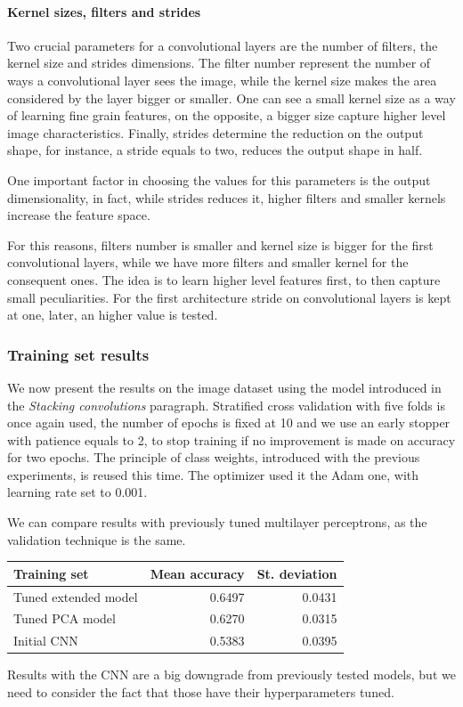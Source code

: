 \paragraph{Kernel sizes, filters and strides}
Two crucial parameters for a convolutional layers are the number of filters, 
the kernel size and strides dimensions. 
The filter number represent the number of ways a 
convolutional layer sees the image, while the kernel size makes the area 
considered by the layer bigger or smaller. One can see a small kernel size as a way 
of learning fine grain features, on the opposite, a bigger size capture higher level image characteristics.
Finally, strides determine the reduction on the output shape, for instance, a stride equals to 
two, reduces the output shape in half.

One important factor in choosing the values for this parameters is the output dimensionality, 
in fact, while strides reduces it, higher filters and smaller kernels increase 
the feature space.

For this reasons, filters number is smaller and kernel size is bigger for the first 
convolutional layers, while we have more filters and smaller kernel for the consequent ones.
The idea is to learn higher level features first, to then capture small peculiarities.
For the first architecture stride on convolutional layers is kept at one, later, an higher value is tested.

\subsubsection{Training set results}
We now present the results on the image dataset using the model introduced in 
the \emph{Stacking convolutions} paragraph. Stratified 
cross validation with five folds is once again used, the number of epochs 
is fixed at 10 and we use an early stopper with patience equals to 2, to stop training 
if no improvement is made on accuracy for two epochs. The principle of 
class weights, introduced with the previous experiments, is reused this time.
The optimizer used it the Adam one, with learning rate set to 0.001.

We can compare results with previously tuned multilayer perceptrons, as the validation
technique is the same.
\begin{center}
    \begin{tabular}{ |l|r|r| } 
        \hline
        Training set & Mean accuracy & St. deviation \\
        \hline
        Tuned extended model& 0.6497 & 0.0431 \\
        Tuned PCA model & 0.6270 & 0.0315 \\
        Initial CNN & 0.5383 & 0.0395 \\
        \hline
    \end{tabular}
\end{center}
Results with the CNN are a big downgrade from previously tested models, 
but we need to consider the fact that those have their 
hyperparameters tuned.

